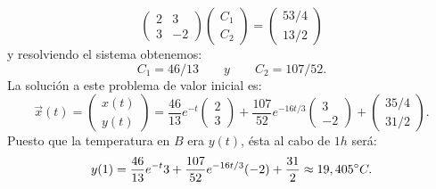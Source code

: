 \begin{ejemplo}
	\begin{equation}
		\begin{pmatrix}
			2 & 3\\ 
			3 & -2
		\end{pmatrix}\begin{pmatrix}	C_1 \\ C_2	\end{pmatrix} = \begin{pmatrix}	53/4 \\ 13/2	\end{pmatrix}
	\end{equation}
	y resolviendo el sistema obtenemos:
	\begin{equation}
		C_1 = 46/13 \qquad y \qquad C_2 = 107/52.
	\end{equation}
	La solución a este problema de valor inicial es:
	\begin{equation}
		\vec{x}(t) = \begin{pmatrix}	x(t) \\ y(t)	\end{pmatrix} = \dfrac{46}{13}e^{-t}\begin{pmatrix}	2 \\ 3	\end{pmatrix} + \dfrac{107}{52}e^{-16t/3}\begin{pmatrix}	3 \\ -2	\end{pmatrix} + \begin{pmatrix}	35/4 \\ 31/2	\end{pmatrix}.
	\end{equation}
	Puesto que la temperatura en $B$ era $y(t)$, ésta al cabo de $1h$ será:
	\begin{equation}
		y(1) = \dfrac{46}{13}e^{-t}3 + \dfrac{107}{52}e^{-16t/3}(-2) + \dfrac{31}{2} \approx 19,405\degree C.
	\end{equation}
\end{ejemplo}


